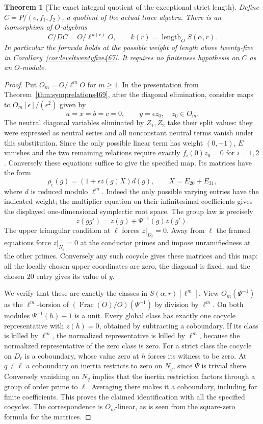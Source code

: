 \documentclass[a4paper,11pt]{article}
\newtheorem{theorem}[proposition]{Theorem}
\theoremstyle{definition}
\theoremstyle{remark}
\numberwithin{equation}{section}
\begin{document}
\begin{theorem}[The exact integral quotient of the exceptional strict length]\leavevmode
\label{thm:exactstricttrace470}
Define \(C=P/(e,f_1,f_2)\), a quotient of the actual trace algebra.
There is an isomorphism of \(O\)-algebras
\[
               C/DC = O/\ell^{\,k(r)}O,\qquad
                    k(r)=\operatorname{length}_O S(\alpha,r).
\]
In particular the formula holds at the possible weight of length
above twenty-five in Corollary~\ref{cor:leveltwentyfive467}.
It requires no finiteness hypothesis on \(C\) as an \(O\)-module.
\end{theorem}
\begin{proof}
Put \(O_m=O/\ell^mO\) for \(m\ge1\). In the presentation from
Theorem~\ref{thm:symprelations469}, after the diagonal elimination,
consider maps to \(O_m[\epsilon]/(\epsilon^2)\) given by
\[
              a=x=b=c=0,\qquad y=\epsilon z_0,\quad z_0\in O_m .
\]
The neutral diagonal variables eliminated by \(Z_1,Z_2\) take their
split values: they were expressed as neutral series and all nonconstant
neutral terms vanish under this substitution. Since the only possible
linear term has weight \((0,-1)\), \(E\) vanishes and the two remaining
relations require exactly \(f_i(0)z_0=0\) for \(i=1,2\). Conversely
these equations suffice to give the specified map. Its matrices have
the form
\[
       \rho_\epsilon(g)=(1+\epsilon z(g)X)d(g),\qquad
                              X=E_{20}+E_{31},
\]
where \(d\) is reduced modulo \(\ell^m\). Indeed the only possible
varying entries have the indicated weight; the multiplier equation
on their infinitesimal coefficients gives the displayed one-dimensional
symplectic root space. The group law is precisely
\[
           z(gg')=z(g)+\Psi^{-1}(g) z(g').
\]
The upper triangular condition at \(\ell\) forces \(z|_{D_\ell}=0\).
Away from \(\ell\) the framed equations force \(z|_{N_q}=0\) at
the conductor primes and impose unramifiedness at the other primes.
Conversely any such cocycle gives these matrices and this map:
all the locally chosen upper coordinates are zero, the diagonal is
fixed, and the chosen \(20\) entry gives its value of \(y\).

We verify that these are exactly the classes in \(S(\alpha,r)[\ell^m]\).
View \(O_m(\Psi^{-1})\) as the \(\ell^m\)-torsion of
\((\operatorname{Frac}(O)/O)(\Psi^{-1})\) by division by \(\ell^m\).
On both modules \(\Psi^{-1}(h)-1\) is a unit. Every global class
has exactly one cocycle representative with \(z(h)=0\), obtained
by subtracting a coboundary. If its class is killed by \(\ell^m\),
the normalized representative is killed by \(\ell^m\), because
the normalized representative of the zero class is zero. For a
strict class the cocycle on \(D_\ell\) is a coboundary, whose
value zero at \(h\) forces its witness to be zero. At \(q\ne\ell\)
a coboundary on inertia restricts to zero on \(N_q\), since
\(\Psi\) is trivial there. Conversely vanishing on \(N_q\) implies
that the inertia restriction factors through a group of order prime
to \(\ell\). Averaging there makes it a coboundary, including for
finite coefficients. This proves the claimed identification with all
the specified cocycles. The correspondence is \(O_m\)-linear, as
is seen from the square-zero formula for the matrices.


\end{proof}
\end{document}
